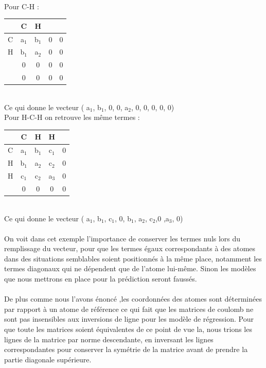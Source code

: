 \documentclass[a4paper,12pt,titlepage]{report}
\begin{document}
\paragraph{}
Pour C-H :
\begin{tabular}{ l | c c c c }
	 & C 	& H 	&   &		\\
	 \hline
   C & a$_1$ & b$_1$ &  0 & 0   \\
   H & b$_1$ & a$_2$ &	0 & 0	\\
    & 0 & 0 & 0 & 0	 \\
   & 0 & 0 & 0 & 0 \\
    \end{tabular} \\
Ce qui donne le vecteur ( a$_1$, b$_1$, 0, 0, a$_2$, 0, 0, 0, 0, 0) \\
Pour H-C-H on retrouve les même termes :
\begin{tabular}{ l | c c c c }
	 & C 	& H 	& H  &		\\
	 \hline
   C & a$_1$ & b$_1$ &  c$_1$ & 0   \\
   H & b$_1$ & a$_2$ &	c$_2$ & 0	\\
   H & c$_1$ & c$_2$ &	a$_3$ & 0	\\
   & 0 & 0 & 0 & 0 \\
    \end{tabular} \\
 Ce qui donne le vecteur ( a$_1$, b$_1$, c$_1$, 0, b$_1$, a$_2$, c$_2$,0 ,a$_3$, 0)
 \paragraph{}
On voit dans cet exemple l'importance de conserver les termes nuls lors du remplissage du vecteur, pour que les termes égaux correspondants à des atomes dans des situations semblables soient positionnés à la même place, notamment les termes diagonaux qui ne dépendent que de l'atome lui-même. Sinon les modèles que nous mettrons en place pour la prédiction seront faussés.

\paragraph{}
De plus comme nous l'avons énoncé ,les coordonnées des atomes sont déterminées par rapport à un atome de référence ce qui fait que les matrices de coulomb ne sont pas insensibles aux inversions de ligne pour les modèle de régression. Pour que toute les matrices soient équivalentes de ce point de vue la, nous trions les lignes de la matrice par norme descendante, en inversant les lignes correspondantes pour conserver la symétrie de la matrice avant de prendre la partie diagonale supérieure.\\
\end{document}
